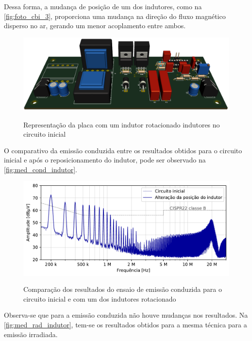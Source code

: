     Dessa forma, a mudança de posição de um dos indutores, como na \autoref{fig:foto_cbi_3}, proporciona uma mudança na direção do fluxo magnético disperso no ar, gerando um menor acoplamento entre ambos. 
    
    \begin{figure}[H]
    	\centering
    	\caption{Representação da placa com um indutor rotacionado indutores no circuito inicial}
    	\includegraphics[scale=.3]{pdf/fotos/tecnica_indutor.png}
        \label{fig:foto_cbi_3}
    \end{figure}
    
    O  comparativo da emissão conduzida entre os resultados obtidos para o circuito inicial e após o reposicionamento do indutor, pode ser observado na \autoref{fig:med_cond_indutor}.
    
    \begin{figure}[H]
    	\centering
    	\caption{Comparação dos resultados do ensaio de emissão conduzida para o circuito inicial e com um dos indutores rotacionado}
    	\includegraphics[scale=.9]{pdf/cond/Alteração da posição do indutor.pdf}
    	\label{fig:med_cond_indutor}
    \end{figure}
    
    Observa-se que para a emissão conduzida não houve mudanças nos resultados. Na \autoref{fig:med_rad_indutor}, tem-se os resultados obtidos para a mesma técnica para a emissão irradiada. 
    

